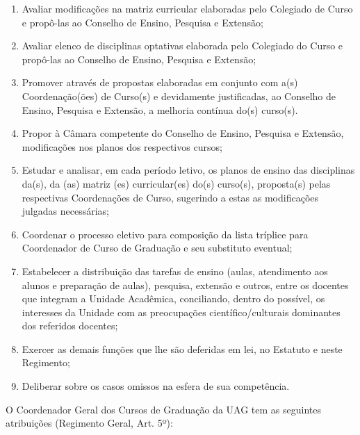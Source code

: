 \documentclass[
	12pt,				%
	openright,			%
  oneside,     %
	a4paper,			%
 hyphens,
	chapter=TITLE,		%
	english,			%
	french,				%
	spanish,			%
	brazil				%
	]{abntex2}
\begin{document}
\begin{enumerate}
    \item Avaliar modificações na matriz curricular elaboradas pelo Colegiado de Curso e propô-las ao Conselho de Ensino, Pesquisa e Extensão;
    \item Avaliar elenco de disciplinas optativas elaborada pelo Colegiado do Curso e propô-las ao Conselho de Ensino, Pesquisa e Extensão;
    \item Promover através de propostas elaboradas em conjunto com a(s) 	Coordenação(ões) de Curso(s) e devidamente justificadas, ao Conselho de Ensino, Pesquisa e Extensão, a melhoria contínua do(s) curso(s).
    \item Propor 	à Câmara competente do Conselho de Ensino, Pesquisa e Extensão,  modificações nos planos dos respectivos cursos;
    \item Estudar e analisar, em cada período letivo, os planos de ensino das 	disciplinas da(s), da (as) matriz (es) curricular(es) do(s) curso(s), proposta(s) pelas respectivas Coordenações de Curso, sugerindo a estas as modificações julgadas necessárias;
    \item Coordenar o processo eletivo para composição da lista tríplice para Coordenador de Curso de Graduação e seu substituto eventual;
    \item Estabelecer a distribuição das tarefas de ensino (aulas, atendimento aos alunos e preparação de aulas), pesquisa, extensão e outros, entre os docentes que integram a Unidade Acadêmica, conciliando, dentro  do possível, os interesses da Unidade com as preocupações 	científico/culturais dominantes dos referidos docentes;
    \item Exercer as demais funções que lhe são deferidas em lei, no Estatuto e neste Regimento;
    \item Deliberar sobre os casos omissos na esfera de sua competência.
\end{enumerate}

O Coordenador Geral dos Cursos de Graduação da UAG tem as seguintes atribuições (Regimento Geral, Art. 5º):
\end{document}
